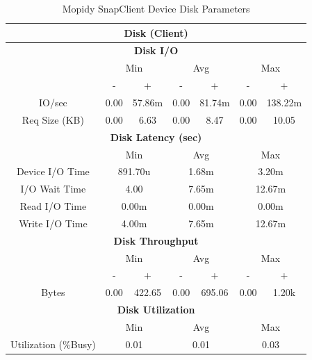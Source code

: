 \documentclass[11pt,a4paper,headinclude=false,footinclude=false]{scrreprt}
\begin{document}
\begin{table}[H]
\centering
    \begin{tabular}{||c|c|c|c|c|c|c||}
    \hline
    \multicolumn{7}{|c|}{\textbf{Disk (Client)}} \\
    \hline
    \multicolumn{7}{|c|}{\textbf{Disk I/O}} \\
    \hline\hline
      & \multicolumn{2}{|c|}{Min} & \multicolumn{2}{|c|}{Avg} & \multicolumn{2}{|c|}{Max} \\
    \hline
      & - & + & - & + & - & + \\
    \hline
    IO/sec & 0.00 & 57.86m & 0.00 & 81.74m & 0.00 & 138.22m \\
    \hline
    Req Size (KB) & 0.00 & 6.63 & 0.00 & 8.47 & 0.00 & 10.05 \\
    \hline\hline
    \multicolumn{7}{|c|}{\textbf{Disk Latency (sec)}} \\
    \hline\hline
      & \multicolumn{2}{|c|}{Min} & \multicolumn{2}{|c|}{Avg} & \multicolumn{2}{|c|}{Max} \\
    \hline
    Device I/O Time  & \multicolumn{2}{|c|}{891.70u} & \multicolumn{2}{|c|}{1.68m} & \multicolumn{2}{|c|}{3.20m} \\
    \hline
    I/O Wait Time  & \multicolumn{2}{|c|}{4.00} & \multicolumn{2}{|c|}{7.65m} & \multicolumn{2}{|c|}{12.67m} \\
    \hline
    Read I/O Time  & \multicolumn{2}{|c|}{0.00m} & \multicolumn{2}{|c|}{0.00m} & \multicolumn{2}{|c|}{0.00m} \\
    \hline
    Write I/O Time  & \multicolumn{2}{|c|}{4.00m} & \multicolumn{2}{|c|}{7.65m} & \multicolumn{2}{|c|}{12.67m} \\
    \hline\hline
    \multicolumn{7}{|c|}{\textbf{Disk Throughput}} \\
    \hline\hline
      & \multicolumn{2}{|c|}{Min} & \multicolumn{2}{|c|}{Avg} & \multicolumn{2}{|c|}{Max} \\
    \hline
      & - & + & - & + & - & + \\
    \hline
    Bytes & 0.00 & 422.65 & 0.00 & 695.06 & 0.00 & 1.20k \\
    \hline\hline
    \multicolumn{7}{|c|}{\textbf{Disk Utilization}} \\
    \hline\hline
      & \multicolumn{2}{|c|}{Min} & \multicolumn{2}{|c|}{Avg} & \multicolumn{2}{|c|}{Max} \\
    \hline
    Utilization (\%Busy)  & \multicolumn{2}{|c|}{0.01} & \multicolumn{2}{|c|}{0.01} & \multicolumn{2}{|c|}{0.03} \\
    \hline\hline
    \end{tabular}
    \caption{Mopidy SnapClient Device Disk Parameters}
    \label{MopidyclientDiskTab}
\end{table}
\end{document}
